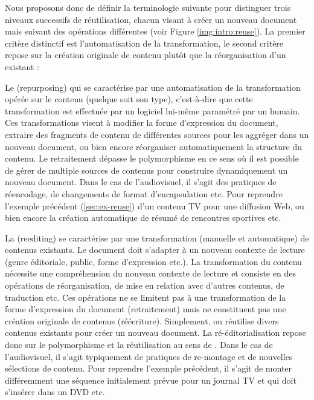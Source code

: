Nous proposons donc de définir la terminologie suivante pour distinguer trois niveaux successifs de réutilisation, chacun visant à créer un nouveau document mais suivant des opérations différentes (voir Figure \ref{img:intro:reuse}). 
La premier critère distinctif est l'automatisation de la transformation, le second critère repose sur la création originale de contenu plutôt que la réorganisation d'un existant : 
\begin{liste}
	\item Le  (repurposing) qui se caractérise par une automatisation de la transformation opérée sur le contenu (quelque soit son type), c'est-à-dire que cette transformation est effectuée par un logiciel lui-même paramétré par un humain. 
	Ces transformations visent à modifier la forme d'expression du document, extraire des fragments de contenu de différentes sources pour les aggréger dans un nouveau document, ou bien encore réorganiser automatiquement la structure du contenu. 
	Le retraitement dépasse le polymorphisme en ce sens où il est possible de gérer de multiple sources de contenus pour construire dynamiquement un nouveau document. 
	Dans le cas de l'audiovisuel, il s'agit des pratiques de réencodage, de changements de format d'encapsulation etc.
	Pour reprendre l'exemple précédent (\ref{sec:ex-reuse}) d'un contenu TV pour une diffusion Web, ou bien encore la création automatique de résumé de rencontres sportives etc. \\

	\item La  (reediting) se caractérise par une transformation (manuelle et automatique) de contenus existants. 
	Le document doit s'adapter à un nouveau contexte de lecture (genre éditoriale, public, forme d'expression etc.).
	La transformation du contenu nécessite une compréhension du nouveau contexte de lecture et consiste en des opérations de réorganisation, de mise en relation avec d'autres contenus, de traduction etc. 
	Ces opérations ne se limitent pas à une transformation de la forme d'expression du document (retraitement) mais ne constituent pas une création originale de contenus (réécriture). 
	Simplement, on réutilise divers contenus existants pour créer un nouveau document.  
	La ré-éditorialisation repose donc sur le polymorphisme et la réutilisation au sens de \cite{Crozat2011}.
	Dans le cas de l'audiovisuel, il s'agit typiquement de pratiques de re-montage et de nouvelles sélections de contenu. 
	Pour reprendre l'exemple précédent, il s'agit de monter différemment une séquence initialement prévue pour un journal TV et qui doit s'insérer dans un DVD etc. \\


\end{liste}
